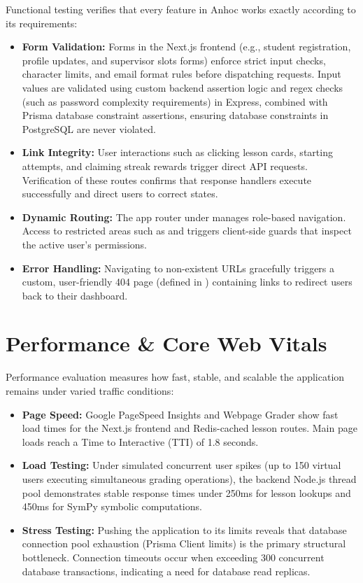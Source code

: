Functional testing verifies that every feature in Anhoc works exactly according to its requirements:
\begin{itemize}
  \item \textbf{Form Validation:} Forms in the Next.js frontend (e.g., student registration, profile updates, and supervisor slots forms) enforce strict input checks, character limits, and email format rules before dispatching requests. Input values are validated using custom backend assertion logic and regex checks (such as password complexity requirements) in Express, combined with Prisma database constraint assertions, ensuring database constraints in PostgreSQL are never violated.
  \item \textbf{Link Integrity:} User interactions such as clicking lesson cards, starting attempts, and claiming streak rewards trigger direct API requests. Verification of these routes confirms that response handlers execute successfully and direct users to correct states.
  \item \textbf{Dynamic Routing:} The app router under  manages role-based navigation. Access to restricted areas such as  and  triggers client-side guards that inspect the active user's permissions.
  \item \textbf{Error Handling:} Navigating to non-existent URLs gracefully triggers a custom, user-friendly 404 page (defined in ) containing links to redirect users back to their dashboard.
\end{itemize}

\section{Performance \& Core Web Vitals}

Performance evaluation measures how fast, stable, and scalable the application remains under varied traffic conditions:
\begin{itemize}
  \item \textbf{Page Speed:} Google PageSpeed Insights and Webpage Grader show fast load times for the Next.js frontend and Redis-cached lesson routes. Main page loads reach a Time to Interactive (TTI) of 1.8 seconds.
  \item \textbf{Load Testing:} Under simulated concurrent user spikes (up to 150 virtual users executing simultaneous grading operations), the backend Node.js thread pool demonstrates stable response times under 250ms for lesson lookups and 450ms for SymPy symbolic computations.
  \item \textbf{Stress Testing:} Pushing the application to its limits reveals that database connection pool exhaustion (Prisma Client limits) is the primary structural bottleneck. Connection timeouts occur when exceeding 300 concurrent database transactions, indicating a need for database read replicas.
\end{itemize}

